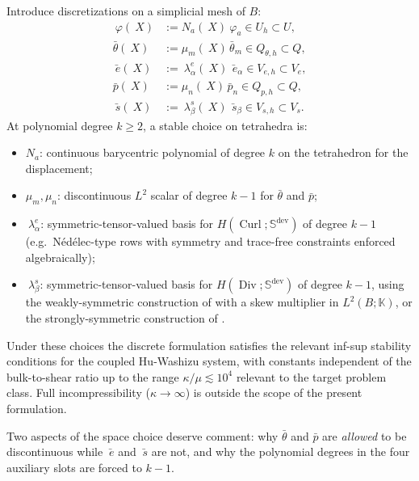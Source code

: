 \documentclass[12pt]{article}
\newcommand{\ebar}{\bar{~e}}
\newcommand{\sbar}{\bar{~s}}
\newcommand{\thbar}{\bar{\theta}}
\newcommand{\pbar}{\bar{p}}
\newcommand{\supdev}{^{\mathrm{dev}}}
\newcommand{\Symsd}{\mathbb{S}\supdev}
\DeclareMathOperator{\Div}{Div}
\DeclareMathOperator{\Curl}{Curl}
\begin{document}
Introduce discretizations on a simplicial mesh of $B$:
\begin{equation}
  \label{eq:basis-functions}
  \begin{split}
    ~\varphi(~X) & := N_a(~X) ~\varphi_a \in U_h \subset U,
    \\
    \thbar(~X) & := \mu_m(~X) \, \thbar_m \in Q_{\theta,h} \subset Q,
    \\
    \ebar(~X) & := ~\lambda^e_\alpha(~X) \, \ebar_\alpha \in V_{e,h} \subset V_e,
    \\
    \pbar(~X) & := \mu_n(~X) \, \pbar_n \in Q_{p,h} \subset Q,
    \\
    \sbar(~X) & := ~\lambda^s_\beta(~X) \, \sbar_\beta \in V_{s,h} \subset V_s.
  \end{split}
\end{equation}
At polynomial degree $k \geq 2$, a stable choice on tetrahedra is:
\begin{itemize}
  \item $N_a$: continuous barycentric polynomial of degree $k$ on the tetrahedron for the displacement;
  \item $\mu_m, \mu_n$: discontinuous $L^2$ scalar of degree $k-1$
    for $\thbar$ and $\pbar$;
  \item $~\lambda^e_\alpha$: symmetric-tensor-valued basis for
    $H(\Curl; \Symsd)$ of degree $k-1$ (e.g.\ Nédélec-type rows with
    symmetry and trace-free constraints enforced algebraically);
  \item $~\lambda^s_\beta$: symmetric-tensor-valued basis for
    $H(\Div; \Symsd)$ of degree $k-1$, using the weakly-symmetric
    construction of \citet{Arnold.Falk.Winther:2007} with a skew
    multiplier in $L^2(B; \mathbb{K})$, or the strongly-symmetric
    construction of \citet{Arnold.Awanou.Winther:2008}.
\end{itemize}
Under these choices the discrete formulation satisfies the relevant
inf-sup stability conditions for the coupled Hu-Washizu system, with
constants independent of the bulk-to-shear ratio up to the range
$\kappa/\mu \lesssim 10^4$ relevant to the target problem class. Full
incompressibility ($\kappa \rightarrow \infty$) is outside the scope
of the present formulation.

Two aspects of the space choice deserve comment: why $\thbar$ and
$\pbar$ are \emph{allowed} to be discontinuous while $\ebar$ and
$\sbar$ are not, and why the polynomial degrees in the four
auxiliary slots are forced to $k-1$.
\end{document}
